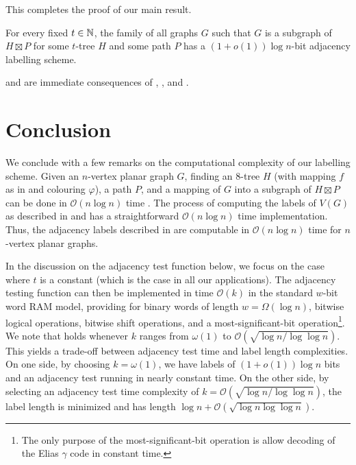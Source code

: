 \documentclass[kpfonts]{patmorin}
\newcommand{\Oh}{\mathcal{O}}
\let\le\leqslant
\begin{document}

This completes the proof of our main result.

\begin{thm}
  For every fixed $t\in\mathbb{N}$, the family of all graphs $G$ such that $G$ is a subgraph of $H\boxtimes P$ for some $t$-tree $H$ and some path $P$ has a $(1+o(1))\log n$-bit adjacency labelling scheme.
\end{thm}

 and  are immediate consequences of , , and .



\section{Conclusion}

We conclude with a few remarks on the computational complexity of our labelling scheme.  Given an $n$-vertex planar graph $G$, finding an 8-tree $H$ (with mapping $f$ as in  and colouring $\varphi$), a path $P$, and a mapping of $G$ into a subgraph of $H\boxtimes P$ can be done in $\Oh(n\log n)$ time \cite{morin:fast}.  The process of computing the labels of $V(G)$ as described in  and  has a straightforward $\Oh(n\log n)$ time implementation.  Thus, the adjacency labels described in  are computable in $\Oh(n\log n)$ time for $n$-vertex planar graphs.

In the discussion on the adjacency test function below, we focus on the case where $t$ is a constant (which is the case in all our applications).
The adjacency testing function can then be implemented in time $\Oh(k)$  in the standard $w$-bit word RAM model, providing for binary words of length $w = \Omega(\log{n})$, bitwise logical operations, bitwise shift operations, and a most-significant-bit operation\footnote{The only purpose of the most-significant-bit operation is allow decoding of the Elias $\gamma$ code in constant time.}.
We note that  holds whenever $k$ ranges from $\omega(1)$ to $\Oh(\sqrt{\log{n} / \log\log{n}})$. This yields a trade-off between adjacency test time and label length complexities. On one side, by choosing $k = \omega(1)$, we have labels of $(1+o(1))\log{n}$ bits and an adjacency test running in nearly constant time. On the other side, by selecting an adjacency test time complexity of $k = \Oh(\sqrt{\log{n}/\log\log{n}})$, the label length is minimized and has length $\log{n} + \Oh(\sqrt{\log{n}\log\log{n}})$.
\end{document}
